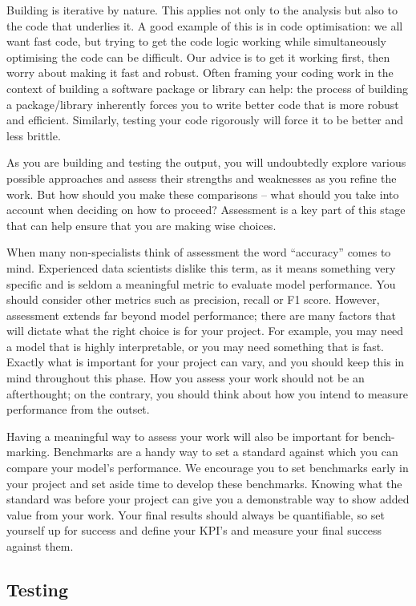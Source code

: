 \documentclass[
]{book}
\begin{document}
Building is iterative by nature. This applies not only to the analysis but also to the code that underlies it. A good example of this is in code optimisation: we all want fast code, but trying to get the code logic working while simultaneously optimising the code can be difficult. Our advice is to get it working first, then worry about making it fast and robust. Often framing your coding work in the context of building a software package or library can help: the process of building a package/library inherently forces you to write better code that is more robust and efficient. Similarly, testing your code rigorously will force it to be better and less brittle.

As you are building and testing the output, you will undoubtedly explore various possible approaches and assess their strengths and weaknesses as you refine the work. But how should you make these comparisons -- what should you take into account when deciding on how to proceed? Assessment is a key part of this stage that can help ensure that you are making wise choices.

When many non-specialists think of assessment the word ``accuracy'' comes to mind. Experienced data scientists dislike this term, as it means something very specific and is seldom a meaningful metric to evaluate model performance. You should consider other metrics such as precision, recall or F1 score. However, assessment extends far beyond model performance; there are many factors that will dictate what the right choice is for your project. For example, you may need a model that is highly interpretable, or you may need something that is fast. Exactly what is important for your project can vary, and you should keep this in mind throughout this phase. How you assess your work should not be an afterthought; on the contrary, you should think about how you intend to measure performance from the outset.

Having a meaningful way to assess your work will also be important for bench-marking. Benchmarks are a handy way to set a standard against which you can compare your model's performance. We encourage you to set benchmarks early in your project and set aside time to develop these benchmarks. Knowing what the standard was before your project can give you a demonstrable way to show added value from your work. Your final results should always be quantifiable, so set yourself up for success and define your KPI's and measure your final success against them.

\hypertarget{testing}{%
\subsection{Testing}\label{testing}}
\end{document}
